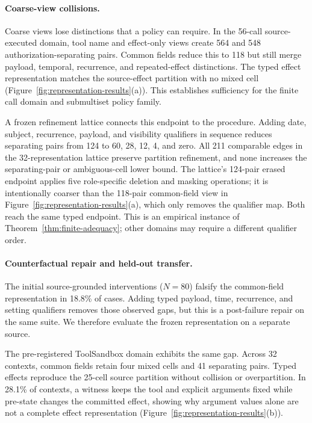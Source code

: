 \documentclass[letterpaper,twocolumn,10pt]{article}
\theoremstyle{definition}
\begin{document}
\paragraph{Coarse-view collisions.}
Coarse views lose distinctions that a policy can require.  In the 56-call
source-executed domain, tool name and effect-only views create 564 and 548
authorization-separating pairs.  Common fields reduce this to 118 but still
merge payload, temporal, recurrence, and repeated-effect distinctions.  The
typed effect representation matches the source-effect partition with no mixed
cell (Figure~\ref{fig:representation-results}(a)).  This establishes sufficiency
for the finite call domain and submultiset policy family.

A frozen refinement lattice connects this endpoint to the procedure.  Adding
date, subject, recurrence, payload, and visibility qualifiers in sequence
reduces separating pairs from 124 to 60, 28, 12, 4, and zero.  All 211
comparable edges in the 32-representation lattice preserve partition
refinement, and none increases the separating-pair or ambiguous-cell lower
bound.  The lattice's 124-pair erased endpoint applies five role-specific
deletion and masking operations; it is intentionally coarser than the
118-pair common-field view in Figure~\ref{fig:representation-results}(a), which
only removes the qualifier map.  Both reach the same typed endpoint.  This is
an empirical instance of Theorem~\ref{thm:finite-adequacy}; other domains may
require a different qualifier order.

\paragraph{Counterfactual repair and held-out transfer.}
The initial source-grounded interventions ($N=80$) falsify the common-field
representation in 18.8\% of cases.  Adding typed payload, time, recurrence, and
setting qualifiers removes those observed gaps, but this is a post-failure
repair on the same suite.  We therefore evaluate the frozen representation on
a separate source.

The pre-registered ToolSandbox domain exhibits the same gap.  Across 32
contexts, common fields retain four mixed
cells and 41 separating pairs.  Typed effects reproduce the 25-cell source
partition without collision or overpartition.  In 28.1\% of contexts, a
witness keeps the tool and explicit arguments fixed while pre-state changes the committed effect,
showing why argument values alone are not a complete effect representation
(Figure~\ref{fig:representation-results}(b)).
\end{document}
